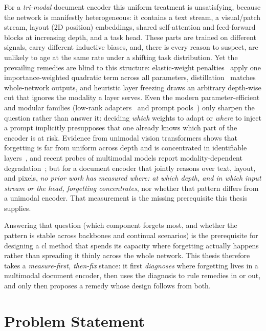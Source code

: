 For a \emph{tri-modal} document encoder this uniform treatment is unsatisfying,
because the network is manifestly heterogeneous: it contains a text stream, a
visual/patch stream, layout (2D position) embeddings, shared self-attention and
feed-forward blocks at increasing depth, and a task head. These parts are trained
on different signals, carry different inductive biases, and, there is every reason
to suspect, are unlikely to age at the same rate under a shifting task
distribution. Yet the prevailing
remedies are blind to this structure: elastic-weight
penalties~\citep{kirkpatrick2017ewc} apply one importance-weighted quadratic term
across all parameters, distillation~\citep{li2017lwf} matches whole-network
outputs, and heuristic layer freezing draws an arbitrary depth-wise cut that
ignores the modality a layer serves. Even the modern parameter-efficient and
modular families (low-rank adapters~\citep{wang2023olora} and prompt
pools~\citep{wang2022l2p,wang2022dualprompt,smith2023coda}) only sharpen the
question rather than answer it: deciding \emph{which} weights to adapt or
\emph{where} to inject a prompt implicitly presupposes that one already knows which
part of the encoder is at risk. Evidence from unimodal vision transformers shows
that forgetting is far from uniform across depth and is concentrated in identifiable
layers~\citep{ramasesh2021anatomy}, and recent probes of multimodal models report
modality-dependent degradation~\citep{zhai2023investigating}; but for a document
encoder that jointly reasons over text, layout, and pixels, \emph{no prior work has
measured where: at which depth, and in which input stream or the head, forgetting
concentrates}, nor whether that pattern differs from a unimodal encoder. That
measurement is the missing prerequisite this thesis supplies.

Answering that question (which component forgets most, and whether the pattern is
stable across backbones and continual scenarios) is the prerequisite for designing a
\gls{cl} method that spends its capacity where forgetting actually happens rather than
spreading it thinly across the whole network. This thesis therefore takes a
\emph{measure-first, then-fix} stance: it first \emph{diagnoses} where forgetting lives in a
multimodal document encoder, then uses the diagnosis to rule remedies in or out, and only
then proposes a remedy whose design follows from both.

\section{Problem Statement}
\label{sec:intro-problem}

